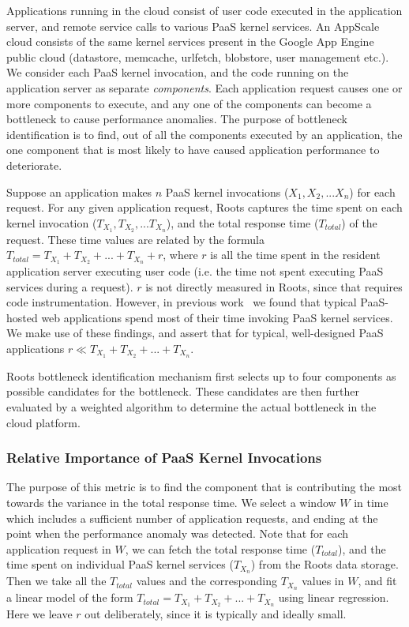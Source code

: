 Applications running in the cloud consist of user code executed in the application server, 
and remote service calls to various PaaS kernel services. An AppScale cloud
consists of the same kernel services present in the Google App Engine public cloud (datastore, memcache,
urlfetch, blobstore, user management etc.).
We consider each PaaS kernel invocation, and the code running on the application server as 
separate \textit{components}. Each application request causes one or more components to
execute, and any one of the components can become a bottleneck to cause performance anomalies.  
The purpose of bottleneck identification is to find, out of all
the components executed by an application, the one component that is most likely to have caused 
application performance to deteriorate.

Suppose an application makes $n$ PaaS kernel invocations ($X_1, X_2, ... X_n$) for each request. 
For any given application request,
Roots captures the time spent on each kernel invocation ($T_{X_1}, T_{X_2}, ... T_{X_n}$), and the 
total response time ($T_{total}$) of the request. These time values are related by the formula
$T_{total} = T_{X_1} + T_{X_2} + ... + T_{X_n} + r$, where $r$ is all the time spent in the resident 
application server executing user code (i.e. the time not
spent executing PaaS services during a request). $r$ is not
directly measured in Roots, since that requires code instrumentation.
However, in previous
work~\cite{Jayathilaka:2015:RTS:2806777.2806842} we found that typical
PaaS-hosted web applications spend most of their time invoking PaaS kernel services.
We make use of these findings, and assert that for typical,
well-designed PaaS applications $r \ll T_{X_1} + T_{X_2} + ... + T_{X_n}$.

Roots bottleneck identification mechanism first
selects up to four components as possible candidates
for the bottleneck. These candidates are then further evaluated by a weighted algorithm to
determine the actual bottleneck in the cloud platform. 

\subsubsection{Relative Importance of PaaS Kernel Invocations} 
The purpose of this metric is to find the component that is contributing 
the most towards the variance in the total response time. 
We select a window $W$ in time which includes a sufficient number of application requests,
and ending at the point when the performance anomaly was detected. Note that for each application request
in $W$, we can fetch the total response time ($T_{total}$), and the time spent on individual PaaS kernel
services ($T_{X_n}$) from the Roots data storage.
Then we take all the $T_{total}$ values
and the corresponding $T_{X_n}$ values in $W$, and fit 
a linear model of the form 
$T_{total} = T_{X_1} + T_{X_2} + ... + T_{X_n}$
using linear regression. Here we leave $r$ out
deliberately, since it is typically and ideally small. 

